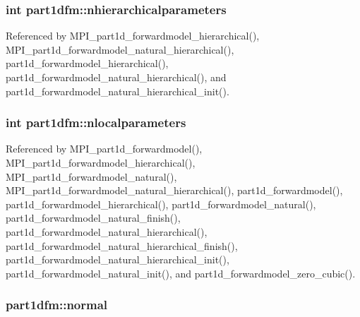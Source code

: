 \subsubsection[{\texorpdfstring{nhierarchicalparameters}{nhierarchicalparameters}}]{\setlength{\rightskip}{0pt plus 5cm}int part1dfm\+::nhierarchicalparameters}\hypertarget{structpart1dfm_a6e33f7b8588bf074fc851fddcd358d44}{}\label{structpart1dfm_a6e33f7b8588bf074fc851fddcd358d44}


Referenced by M\+P\+I\+\_\+part1d\+\_\+forwardmodel\+\_\+hierarchical(), M\+P\+I\+\_\+part1d\+\_\+forwardmodel\+\_\+natural\+\_\+hierarchical(), part1d\+\_\+forwardmodel\+\_\+hierarchical(), part1d\+\_\+forwardmodel\+\_\+natural\+\_\+hierarchical(), and part1d\+\_\+forwardmodel\+\_\+natural\+\_\+hierarchical\+\_\+init().

\subsubsection[{\texorpdfstring{nlocalparameters}{nlocalparameters}}]{\setlength{\rightskip}{0pt plus 5cm}int part1dfm\+::nlocalparameters}\hypertarget{structpart1dfm_a3fccfef80cd67db9f4d22877918ea347}{}\label{structpart1dfm_a3fccfef80cd67db9f4d22877918ea347}


Referenced by M\+P\+I\+\_\+part1d\+\_\+forwardmodel(), M\+P\+I\+\_\+part1d\+\_\+forwardmodel\+\_\+hierarchical(), M\+P\+I\+\_\+part1d\+\_\+forwardmodel\+\_\+natural(), M\+P\+I\+\_\+part1d\+\_\+forwardmodel\+\_\+natural\+\_\+hierarchical(), part1d\+\_\+forwardmodel(), part1d\+\_\+forwardmodel\+\_\+hierarchical(), part1d\+\_\+forwardmodel\+\_\+natural(), part1d\+\_\+forwardmodel\+\_\+natural\+\_\+finish(), part1d\+\_\+forwardmodel\+\_\+natural\+\_\+hierarchical(), part1d\+\_\+forwardmodel\+\_\+natural\+\_\+hierarchical\+\_\+finish(), part1d\+\_\+forwardmodel\+\_\+natural\+\_\+hierarchical\+\_\+init(), part1d\+\_\+forwardmodel\+\_\+natural\+\_\+init(), and part1d\+\_\+forwardmodel\+\_\+zero\+\_\+cubic().

\subsubsection[{\texorpdfstring{normal}{normal}}]{ part1dfm\+::normal}\hypertarget{structpart1dfm_ad469a99c23e84b8a0bbdef538814c583}{}\label{structpart1dfm_ad469a99c23e84b8a0bbdef538814c583}


